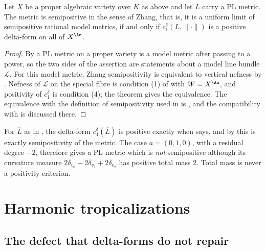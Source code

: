 \begin{corollary}
\label{cor:ch18-zhang}
Let $X$ be a proper algebraic variety over $K$ as above and let $L$ carry a
PL metric.  The metric is semipositive in the sense of Zhang, that is, it is a uniform limit of semipositive rational model metrics,
if and only if $c_1^\delta(L,\|\cdot\|)$ is a positive delta-form on all of
$X^{\An}$.
\end{corollary}

\begin{proof}
By  a PL metric on a proper variety is a
model metric after passing to a power, so the two sides of the assertion are
statements about a model line bundle $\mathcal L$.  For this model metric, Zhang semipositivity is equivalent to vertical
nefness by \cite[Proposition~7.2]{GK19}.  Nefness of
$\mathcal L$ on the special fibre is condition (1) of
 with $W=X^{\An}$, and positivity
of $c_1^\delta$ is condition (4); the theorem gives the equivalence.  The
equivalence with the definition of semipositivity used in
 is , and
the compatibility with \cite{GM19} is discussed there.
\end{proof}

\begin{example}
\label{ex:ch18-zhang-chain}
For $\overline L$ as in , the delta-form
$c_1^\delta(\overline L)$ is positive exactly when
 says, and by
 this is exactly semipositivity of the metric.  The
case $a=(0,1,0)$, with a residual degree $-2$, therefore gives a PL metric
which is \emph{not} semipositive although its curvature measure
$2\delta_{v_0}-2\delta_{v_1}+2\delta_{v_2}$ has positive total mass $2$.
Total mass is never a positivity criterion.
\end{example}

\section{Harmonic tropicalizations}
\label{sec:harmonic-trop}

\subsection{The defect that delta-forms do not repair}
\label{sec:ch18-harmonic-motivation}

